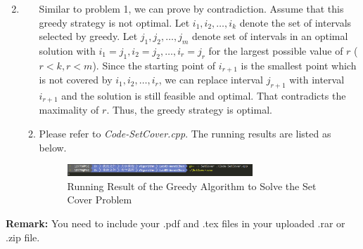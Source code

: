 \documentclass[12pt,a4paper]{article}
\makeatletter
\newtheorem*{solution}{Solution}
\theoremstyle{definition}
\renewenvironment{solution}[1][Solution] {\par\pushQED{\qed}\normalfont\topsep6\p@\@plus6\p@\relax\trivlist\item[\hskip\labelsep\bfseries#1\@addpunct{.}]\ignorespaces}{\popQED\endtrivlist\@endpefalse} \makeatother
\makeatother
\begin{document}
\begin{enumerate}
\begin{solution}
\begin{enumerate}
\begin{figure}[htbp]
            \end{figure}
        Similar to problem 1, we can prove by contradiction. Assume that this greedy strategy is not optimal. Let $i_1,i_2,\dots,i_k$ denote the set of intervals selected by greedy. Let $j_1,j_2,\dots,j_m$ denote set of intervals in an optimal solution with $i_1=j_1,i_2=j_2,\dots,i_r=j_r$ for the largest possible value of $r$ ($r<k,r<m$). Since the starting point of $i_{r+1}$ is the smallest point which is not covered by $i_1,i_2,\dots,i_r$, we can replace interval $j_{r+1}$ with interval $i_{r+1}$ and the solution is still feasible and optimal. That contradicts the maximality of $r$. Thus, the greedy strategy is optimal.
        \item 
        Please refer to \emph{Code-SetCover.cpp}.
        The running results are listed as below.
        \begin{figure}[htbp]
                \centering
                \includegraphics[width=0.7\textwidth]{Fig-SetCover_Result.png}
                \caption{Running Result of the Greedy Algorithm to Solve the Set Cover Problem}\label{Fig-Interval-Scheduling}
            \end{figure}
        \end{enumerate}
    \end{solution}
    
\end{enumerate}



\vspace{20pt}

\textbf{Remark:} You need to include your .pdf and .tex files in your uploaded .rar or .zip file.

\end{document}
